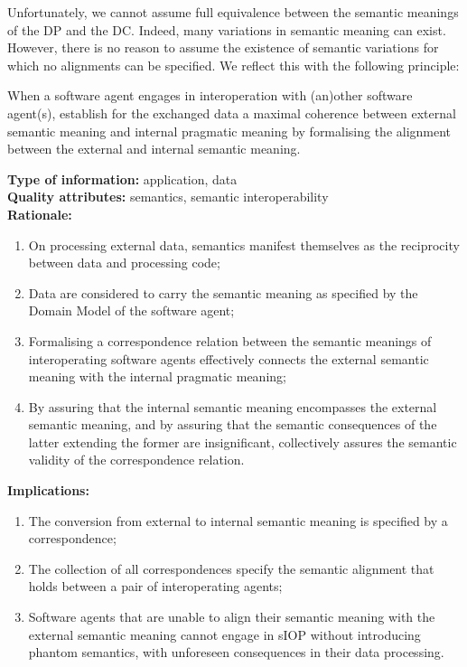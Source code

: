 \documentclass[sort&compress,preprint,authoryear,3p,twocolumn]{elsarticle}
\begin{document}
Unfortunately, we cannot assume full equivalence between the semantic
meanings of the DP and the DC. Indeed, many variations in semantic
meaning can exist. However, there is no reason to assume the existence
of semantic variations for which no alignments can be specified. We
reflect this with the following principle:

\begin{mmdp}\label{dp:alignment}

When a software agent engages in interoperation with (an)other software agent(s), establish for the exchanged data a maximal coherence between external semantic meaning and internal pragmatic meaning by formalising the alignment between the external and internal semantic meaning.   

\textbf{Type of information:} application, data  \\
\textbf{Quality attributes:} semantics, semantic interoperability   \\
\textbf{Rationale:}
\begin{enumerate}
  \item On processing external data, semantics manifest themselves as the reciprocity between data and processing code;
  \item Data are considered to carry the semantic meaning as specified by the Domain Model of the software agent;
  \item Formalising a correspondence relation between the semantic meanings of interoperating software agents effectively connects the external semantic meaning with the internal pragmatic meaning;
  \item By assuring that the internal semantic meaning encompasses the external semantic meaning, and by assuring that the semantic consequences of the latter extending the former are insignificant, collectively assures the semantic validity of the correspondence relation.
\end{enumerate}
\textbf{Implications:}
\begin{enumerate}
  \item The conversion from external to internal semantic meaning is specified by a correspondence;
  \item The collection of all correspondences specify the semantic alignment that holds between a pair of interoperating agents;
  \item Software agents that are unable to align their semantic meaning with the external semantic meaning cannot engage in sIOP without introducing phantom semantics, with unforeseen consequences in their data processing.
\end{enumerate}  
\end{mmdp}
\end{document}
